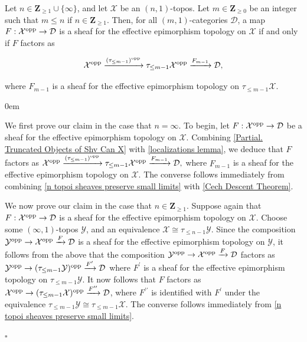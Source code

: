 \documentclass[10pt]{article}
\newcommand{\cD}{\mathcal{D}}
\newcommand{\cX}{\mathcal{X}}
\newcommand{\cY}{\mathcal{Y}}
\newcommand{\ZZ}{\mathbb{Z}}
\def\ZZ{{\mathbf Z}}
\renewcommand{\qed}{\hfill$\square$}
\renewenvironment{proof}{\begin{addmargin}[1em]{0em}\begin{newproof}}{\end{newproof}\end{addmargin}\qed}
\theoremstyle{witharg}
\theoremstyle{witharg}
\theoremstyle{witharg2}
\begin{document}
\begin{corollary}{}\label{Factorization of m sheaves for the eff epi topology}

    Let $n\in \ZZ_{\geq 1}\cup\{\infty\}$, and let $\cX$ be an $(n,1)$-topos. Let $m\in \ZZ_{\geq 0}$ be an integer such that $m \leq n$ if $n\in \ZZ_{\geq 1}$. Then, for all $(m,1)$-categories $\cD$, a map $F:\cX^{\textnormal{opp}}\rightarrow \cD$ is a sheaf for the effective epimorphism topology on $\cX$ if and only if $F$ factors as 

    $$\cX^{\textnormal{opp}}\xrightarrow{(\tau_{\leq m-1})^{\textnormal{opp}}}\tau_{\leq m-1}\cX^{\textnormal{opp}}\xrightarrow{F_{m-1}}\cD,$$

    \noindent where $F_{m-1}$ is a sheaf for the effective epimorphism topology on $\tau_{\leq m-1}\cX$.
    
\end{corollary}

\begin{proof} We first prove our claim in the case that $n=\infty$. To begin, let $F:\cX^{\textnormal{opp}}\rightarrow \cD$ be a sheaf for the effective epimorphism topology on $\cX$. Combining \ref{Partial. Truncated Objects of Shv Can X} with \ref{localizations lemma}, we deduce that $F$ factors as $\cX^{\textnormal{opp}}\xrightarrow{(\tau_{\leq m-1})^{\textnormal{opp}}}\tau_{\leq m-1}\cX^{\textnormal{opp}}\xrightarrow{F_{m-1}}\cD,$ where $F_{m-1}$ is a sheaf for the effective epimorphism topology on $\cX$. The converse follows immediately from combining \ref{n topoi sheaves preserve small limits} with \ref{Cech Descent Theorem}. 

We now prove our claim in the case that $n\in \ZZ_{\geq 1}$. Suppose again that $F:\cX^{\textnormal{opp}}\rightarrow \cD$ is a sheaf for the effective epimorphism topology on $\cX$. Choose some $(\infty,1)$-topos $\cY$, and an equivalence $\cX\cong \tau_{\leq n-1}\cY$. Since the composition $\cY^{\textnormal{opp}}\rightarrow \cX^{\textnormal{opp}}\xrightarrow{F}\cD$ is a sheaf for the effective epimorphism topology on $\cY$, it follows from the above that the composition $\cY^{\textnormal{opp}}\rightarrow \cX^{\textnormal{opp}}\xrightarrow{F}\cD$ factors as $\cY^{\textnormal{opp}}\rightarrow (\tau_{\leq m-1}\cY)^{\textnormal{opp}}\xrightarrow{F^\prime}\cD$ where $F^\prime$ is a sheaf for the effective epimorphism topology on $\tau_{\leq m-1}\cY$. It now follows that $F$ factors as $\cX^{\textnormal{opp}}\rightarrow (\tau_{\leq m-1}\cX)^{\textnormal{opp}}\xrightarrow{F^{\prime\prime}}\cD$, where $F^{\prime\prime}$ is identified with $F^\prime$ under the equivalence $\tau_{\leq m-1}\cY\cong \tau_{\leq m-1}\cX$. The converse follows immediately from \ref{n topoi sheaves preserve small limits}.


\end{proof}
\end{document}
